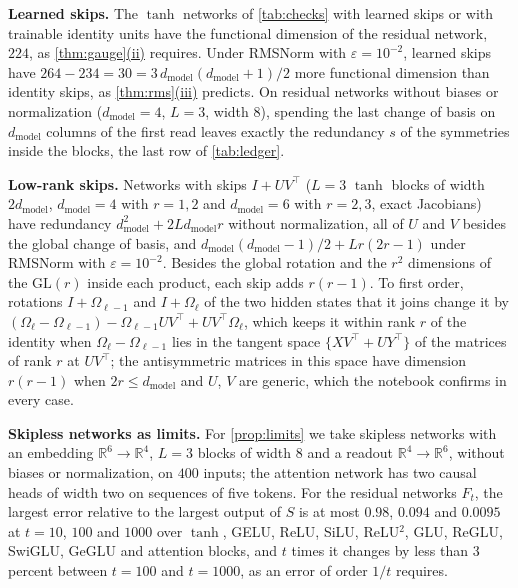 \documentclass[10pt]{article}
\theoremstyle{definition}
\theoremstyle{remark}
\newcommand{\R}{\mathbb{R}}
\newcommand{\dm}{d_{\mathrm{model}}}
\newcommand{\GL}{\mathrm{GL}}
\newcommand{\para}[1]{\smallskip\noindent\textbf{#1}\hspace{0.5em}}
\DeclareRobustCommand{\cpref}[2]{\hyperref[#1:#2]{\cref*{#1}(#2)}}
\begin{document}
\para{Learned skips.} The $\tanh$ networks of \cref{tab:checks} with learned skips or with trainable identity units have the functional dimension of the residual network, $224$, as \cpref{thm:gauge}{ii} requires. Under RMSNorm with $\varepsilon = 10^{-2}$, learned skips have $264 - 234 = 30 = 3\,\dm(\dm+1)/2$ more functional dimension than identity skips, as \cpref{thm:rms}{iii} predicts. On residual networks without biases or normalization ($\dm = 4$, $L = 3$, width $8$), spending the last change of basis on $\dm$ columns of the first read leaves exactly the redundancy $s$ of the symmetries inside the blocks, the last row of \cref{tab:ledger}.

\para{Low-rank skips.} Networks with skips $I + UV^\top$ ($L = 3$ $\tanh$ blocks of width $2\dm$, $\dm = 4$ with $r = 1, 2$ and $\dm = 6$ with $r = 2, 3$, exact Jacobians) have redundancy $\dm^2 + 2L\dm r$ without normalization, all of $U$ and $V$ besides the global change of basis, and $\dm(\dm-1)/2 + Lr(2r-1)$ under RMSNorm with $\varepsilon = 10^{-2}$. Besides the global rotation and the $r^2$ dimensions of the $\GL(r)$ inside each product, each skip adds $r(r-1)$. To first order, rotations $I + \Omega_{\ell-1}$ and $I + \Omega_\ell$ of the two hidden states that it joins change it by $(\Omega_\ell - \Omega_{\ell-1}) - \Omega_{\ell-1}UV^\top + UV^\top\Omega_\ell$, which keeps it within rank $r$ of the identity when $\Omega_\ell - \Omega_{\ell-1}$ lies in the tangent space $\{XV^\top + UY^\top\}$ of the matrices of rank $r$ at $UV^\top$; the antisymmetric matrices in this space have dimension $r(r-1)$ when $2r \le \dm$ and $U$, $V$ are generic, which the notebook confirms in every case.

\para{Skipless networks as limits.} For \cref{prop:limits} we take skipless networks with an embedding $\R^6 \to \R^4$, $L = 3$ blocks of width $8$ and a readout $\R^4 \to \R^6$, without biases or normalization, on $400$ inputs; the attention network has two causal heads of width two on sequences of five tokens. For the residual networks $F_t$, the largest error relative to the largest output of $S$ is at most $0.98$, $0.094$ and $0.0095$ at $t = 10$, $100$ and $1000$ over $\tanh$, GELU, ReLU, SiLU, ReLU$^2$, GLU, ReGLU, SwiGLU, GeGLU and attention blocks, and $t$ times it changes by less than $3$ percent between $t = 100$ and $t = 1000$, as an error of order $1/t$ requires.
\end{document}
